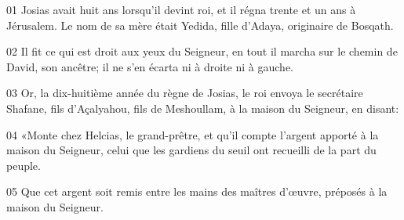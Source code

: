 01 Josias avait huit ans lorsqu’il devint roi, et il régna trente et un ans à Jérusalem. Le nom de sa mère était Yedida, fille d’Adaya, originaire de Bosqath.

02 Il fit ce qui est droit aux yeux du Seigneur, en tout il marcha sur le chemin de David, son ancêtre; il ne s’en écarta ni à droite ni à gauche.

03 Or, la dix-huitième année du règne de Josias, le roi envoya le secrétaire Shafane, fils d’Açalyahou, fils de Meshoullam, à la maison du Seigneur, en disant:

04 «Monte chez Helcias, le grand-prêtre, et qu’il compte l’argent apporté à la maison du Seigneur, celui que les gardiens du seuil ont recueilli de la part du peuple.

05 Que cet argent soit remis entre les mains des maîtres d’œuvre, préposés à la maison du Seigneur.